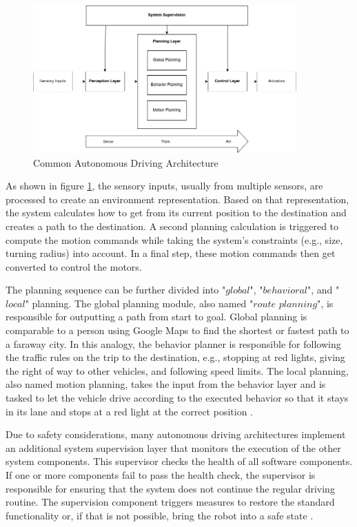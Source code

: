 \begin{figure}[ht]
	\centering
	\includegraphics[width=0.9\textwidth]{images/autonomous_driving_architecture.png}
	\caption{Common Autonomous Driving Architecture \cite{brooks1986,velasco2020}}
	\label{fig:autonomous_driving_architecture}
\end{figure}

As shown in figure \ref{fig:autonomous_driving_architecture}, the sensory inputs, usually from multiple sensors, are processed to create an environment representation. Based on that representation, the system calculates how to get from its current position to the destination and creates a path to the destination. A second planning calculation is triggered to compute the motion commands while taking the system's constraints (e.g., size, turning radius) into account. In a final step, these motion commands then get converted to control the motors. 

The planning sequence can be further divided into "$global$", "$behavioral$", and "$local$" planning. The global planning module, also named "$route$ $planning$", is responsible for outputting a path from start to goal. Global planning is comparable to a person using Google Maps to find the shortest or fastest path to a faraway city. In this analogy, the behavior planner is responsible for following the traffic rules on the trip to the destination, e.g., stopping at red lights, giving the right of way to other vehicles, and following speed limits. The local planning, also named motion planning, takes the input from the behavior layer and is tasked to let the vehicle drive according to the executed behavior so that it stays in its lane and stops at a red light at the correct position \cite{reke2020}.

Due to safety considerations, many autonomous driving architectures implement an additional system supervision layer that monitors the execution of the other system components. This supervisor checks the health of all software components. If one or more components fail to pass the health check, the supervisor is responsible for ensuring that the system does not continue the regular driving routine. The supervision component triggers measures to restore the standard functionality or, if that is not possible, bring the robot into a safe state \cite{zimmermann2020adaptive}.

